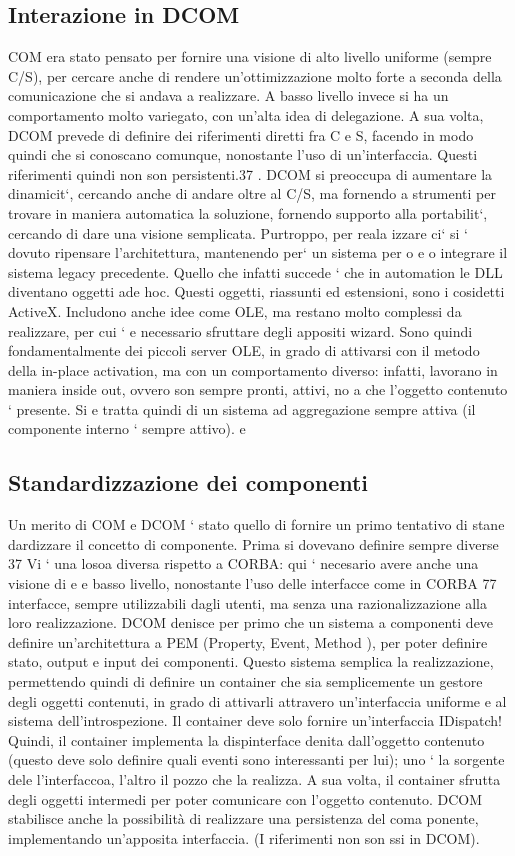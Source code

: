 \documentclass[a4paper,12pt]{article}
\begin{document}
\subsection{Interazione in DCOM}
COM era stato pensato per fornire una visione di alto livello uniforme (sempre
C/S), per cercare anche di rendere un'ottimizzazione molto forte a seconda
della comunicazione che si andava a realizzare. A basso livello invece si ha un
comportamento molto variegato, con un'alta idea di delegazione.
A sua volta, DCOM prevede di definire dei riferimenti diretti fra C e S,
facendo in modo quindi che si conoscano comunque, nonostante l'uso di un'interfaccia. Questi riferimenti quindi non son
persistenti.37 . DCOM si preoccupa
di aumentare la dinamicit`, cercando anche di andare oltre al C/S, ma fornendo
a
strumenti per trovare in maniera automatica la soluzione, fornendo supporto
alla portabilit`, cercando di dare una visione semplicata. Purtroppo, per reala
izzare ci` si ` dovuto ripensare l'architettura, mantenendo per` un sistema per
o e
o
integrare il sistema legacy precedente.
Quello che infatti succede ` che in automation le DLL diventano oggetti ade
hoc. Questi oggetti, riassunti ed estensioni, sono i cosidetti ActiveX. Includono
anche idee come OLE, ma restano molto complessi da realizzare, per cui `
e
necessario sfruttare degli appositi wizard. Sono quindi fondamentalmente dei
piccoli server OLE, in grado di attivarsi con il metodo della in-place activation,
ma con un comportamento diverso: infatti, lavorano in maniera inside out,
ovvero son sempre pronti, attivi, no a che l'oggetto contenuto ` presente. Si
e
tratta quindi di un sistema ad aggregazione sempre attiva (il componente interno
` sempre attivo).
e
\subsection{Standardizzazione dei componenti}
Un merito di COM e DCOM ` stato quello di fornire un primo tentativo di stane
dardizzare il concetto di componente. Prima si dovevano definire sempre diverse
37 Vi ` una losoa diversa rispetto a CORBA: qui ` necesario avere anche una visione di
e
e
basso livello, nonostante l'uso delle interfacce come in CORBA
77
interfacce, sempre utilizzabili dagli utenti, ma senza una razionalizzazione alla
loro realizzazione.
DCOM denisce per primo che un sistema a componenti deve definire un'architettura a PEM (Property, Event, Method ), per
poter definire stato, output
e input dei componenti. Questo sistema semplica la realizzazione, permettendo quindi di definire un container che sia
semplicemente un gestore degli oggetti
contenuti, in grado di attivarli attravero un'interfaccia uniforme e al sistema dell'introspezione. Il container deve
solo fornire un'interfaccia IDispatch! Quindi,
il container implementa la dispinterface denita dall'oggetto contenuto (questo
deve solo definire quali eventi sono interessanti per lui); uno ` la sorgente dele
l'interfaccoa, l'altro il pozzo che la realizza. A sua volta, il container sfrutta
degli oggetti intermedi per poter comunicare con l'oggetto contenuto.
DCOM stabilisce anche la possibilità di realizzare una persistenza del coma
ponente, implementando un'apposita interfaccia. (I riferimenti non son ssi in
DCOM).
\end{document}

